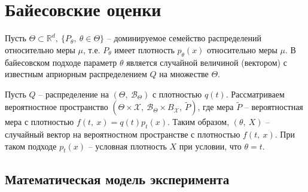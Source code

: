 \section{Байесовские оценки}

Пусть $\displaystyle \Theta \subset \mathbb{R}^{d} ,\ \{P_{\theta } ,\ \theta \in \Theta \}$ -- доминируемое семейство распределений относительно меры $\displaystyle \mu $, т.е. $\displaystyle P_{\theta }$ имеет плотность $\displaystyle p_{\theta }( x)$ относительно меры $\displaystyle \mu $. В байесовском подходе параметр $\displaystyle \theta $ является случайной величиной (вектором) с известным априорным распределением $\displaystyle Q$ на множестве $\displaystyle \Theta $.

Пусть $\displaystyle Q$ -- распределение на $\displaystyle ( \Theta ,\ \mathcal{B}_{\Theta })$ с плотностью $\displaystyle q( t)$. Рассматриваем вероятностное пространство $\displaystyle \left( \Theta \times \mathcal{X} ,\ \mathcal{B}_{\Theta } \times B_{\mathcal{X}} ,\ \tilde{P}\right)$, где мера $\displaystyle \tilde{P}$ -- вероятностная мера с плотностью $\displaystyle f( t,\ x) =q( t) p_{t}( x)$. Таким образом, $\displaystyle ( \theta ,\ X)$ -- случайный вектор на вероятностном пространстве с плотностью $\displaystyle f( t,\ x)$. При таком подходе $\displaystyle p_{t}( x)$ -- условная плотность $\displaystyle X$ при условии, что $\displaystyle \theta =t$.
\subsection{Математическая модель эксперимента}

